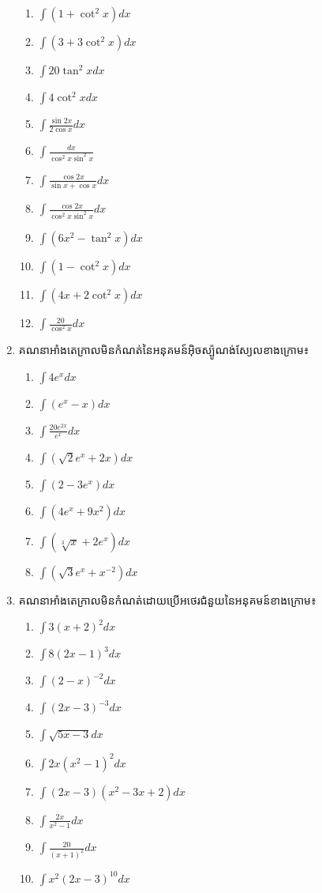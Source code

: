\documentclass[12pt, a4paper]{article}
\begin{document}
\begin{enumerate}[m]
\begin{enumerate}[k, 4]
		\item $\int (1+\cot^2x) dx$
		\item $\int (3+3\cot^2x) dx$
		\item $\int 20\tan^2x dx$
		\item $\int 4\cot^2x dx$
		\item $\int\frac{\sin2x}{2\cos x} dx$
		\item $\int \frac{dx}{\cos^2x\sin^2x} $
		\item $\int \frac{\cos2x}{\sin x+\cos x} dx$
		\item $\int \frac{\cos2x}{\cos^2x\sin^2x} dx$
		\item $\int ( 6x^2-\tan^2x) dx$
		\item $\int (1-\cot^2x) dx$
		\item $\int (4x+2\cot^2x) dx$
		\item $\int \frac{20}{\cos^2x} dx$
	\end{enumerate}
	\item គណនាអាំងតេក្រាលមិនកំណត់នៃអនុគមន៍អ៊ិចស្ប៉ូណង់ស្យែលខាងក្រោម៖
	\begin{enumerate}[k, 4]
		\item $\int 4e^x dx$
		\item $\int (e^x-x) dx$
		\item $\int \frac{20e^{2x}}{e^x} dx$
		\item $\int (\sqrt{2}e^x+2x) dx$
		\item $\int (2-3e^x) dx$
		\item $\int (4e^x+9x^2) dx$
		\item $\int (\sqrt[3]{x} +2e^x) dx$
		\item $\int (\sqrt{3}e^x+x^{-2}) dx$
	\end{enumerate}
	\item គណនាអាំងតេក្រាលមិនកំណត់ដោយប្រើអថេរជំនួយនៃអនុគមន៍ខាងក្រោម៖
	\begin{enumerate}[k, 3]
		\item $\int 3(x+2)^2 dx$
		\item $\int 8(2x-1)^3 dx$
		\item $\int (2-x)^{-2} dx$
		\item $\int (2x-3)^{-3} dx$
		\item $\int \sqrt{5x-3} dx$
		\item $\int 2x(x^2-1)^2 dx$
		\item $\int (2x-3)(x^2-3x+2) dx$
		\item $\int \frac{2x}{x^2-1} dx$
		\item $\int \frac{20}{(x+1)^2} dx$
		\item $\int x^2(2x-3)^{10} dx$

\end{enumerate}
\end{enumerate}
\end{document}
